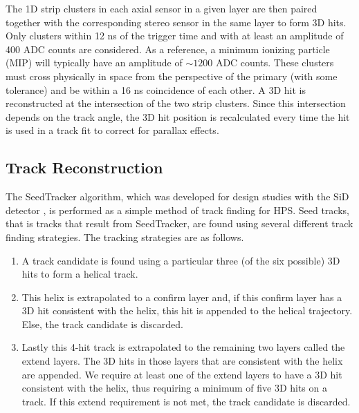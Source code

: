 The 1D strip clusters in each axial sensor in a given layer are then paired together with the corresponding stereo sensor in the same layer to form 3D hits. Only clusters within 12 ns of the trigger time and with at least an amplitude of 400 ADC counts are considered. As a reference, a minimum ionizing particle (MIP) will typically have an amplitude of $\sim 1200$ ADC counts. These clusters must cross physically in space from the perspective of the primary (with some tolerance) and be within a 16 ns coincidence of each other. A 3D hit is reconstructed at the intersection of the two strip clusters. Since this intersection depends on the track angle, the 3D hit position is recalculated every time the hit is used in a track fit to correct for parallax effects.

\clearpage

\subsection{Track Reconstruction} \label{sec:tracking}

The SeedTracker algorithm, which was developed for design studies with the SiD detector \cite{seedtracker}, is performed as a simple method of track finding for HPS. Seed tracks, that is tracks that result from SeedTracker, are found using several different track finding strategies. The tracking strategies are as follows.

\begin{enumerate}
  \item A track candidate is found using a particular three (of the six possible) 3D hits to form a helical track.
  \item This helix is extrapolated to a confirm layer and, if this confirm layer has a 3D hit consistent with the helix, this hit is appended to the helical trajectory. Else, the track candidate is discarded.
  \item Lastly this 4-hit track is extrapolated to the remaining two layers called the extend layers. The 3D hits in those layers that are consistent with the helix are appended. We require at least one of the extend layers to have a 3D hit consistent with the helix, thus requiring a minimum of five 3D hits on a track. If this extend requirement is not met, the track candidate is discarded.
\end{enumerate}


